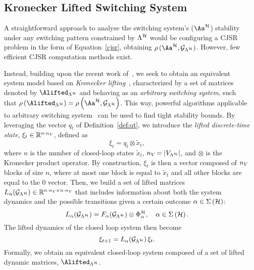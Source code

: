 \subsection{Kronecker Lifted Switching System}%
\label{sec:system_dynamics}
%
A straightforward approach to analyse the switching system's ($\Aa^\strat$) stability under any switching pattern constrained by $\Lambda^{\mathcal{H}}$ would be configuring a CJSR problem in the form of Equation~\eqref{cjsr}, obtaining $\rho\,(\Aa^\strat,\GG{\Lambda^\strat})$.
However, few efficient CJSR computation methods exist.

Instead, building upon the recent work of~\cite{xu2020approximation}, we seek to obtain an equivalent system model based on \emph{Kronecker lifting}~\cite{horn2012matrix}, characterized by a set of matrices denoted by $\Alifted_{\Lambda^\strat}$ and behaving as an \emph{arbitrary switching system}, such that $\rho\funof{\Alifted_{\Lambda^\strat}} = \rho\funof{\Aa^{\strat},\GG{\Lambda^\strat}}$.
This way, powerful algorithms applicable to arbitrary switching system~\cite{vankeerberghen2014jsr,sparsejsr} can be used to find tight stability bounds.
%
By leveraging the vector $q_t$ of Definition~\ref{def:qt}, we introduce the \emph{lifted discrete-time state}, $\xi_t\in\mathbb{R}^{n\cdot n_{V_{}}}$, defined as 
\begin{equation*}
    \xi_t = q_t\otimes \tilde x_t,
\end{equation*}
where $n$ is the number of closed-loop states $\tilde x_t$, $n_{V_{}} = \left|V_{\Lambda^{\mathcal{H}}}\right|$, and $\otimes$ is the Kronecker product operator.
By construction, $\xi_t$ is then a vector composed of $n_{V_{}}$ blocks of size $n$, where at most one block is equal to $\tilde x_t$ and all other blocks are equal to the $0$ vector.
%
Then, we build a set of lifted matrices $L_{\alpha} ( \mathcal{G}_{\Lambda^{\mathcal{H}}} )\in\mathbb{R}^{n\cdot n_{V_{}}\times n\cdot n_{V_{}}}$ that includes information about both the system dynamics and the possible transitions given a certain outcome $\alpha \in \Sigma\left(\mathcal{H}\right)$:
%
\begin{equation*}
    L_{\alpha} ( \mathcal{G}_{\Lambda^{\mathcal{H}}} ) = F_{\alpha} ( \mathcal{G}_{\Lambda^{\mathcal{H}}} )\otimes \Phi{}_\alpha^{\mathcal{H}},\quad \alpha \in \Sigma \left( \mathcal{H} \right).
\end{equation*}
%
The lifted dynamics of the closed loop system then become%
%
\begin{equation*}
    \xi_{t+1} = L_{\alpha} ( \mathcal{G}_{\Lambda^{\mathcal{H}}} )\,\xi_t.
\end{equation*}
%
Formally, we obtain an equivalent closed-loop system composed of a set of lifted dynamic matrices, $\Alifted_{\Lambda^\strat}$.
